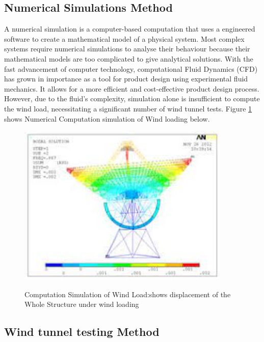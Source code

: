 {\subsection{Numerical Simulations  Method}
 
 A numerical simulation is a computer-based computation that uses a engineered software to create a mathematical model of a physical system. Most complex systems require numerical simulations to analyse their behaviour because their mathematical models are too complicated to give analytical solutions. With the fast advancement of computer technology,  computational Fluid Dynamics (CFD)  has grown in importance as a tool for product design using experimental fluid mechanics.\cite{kathrein_2016,en19911,omenzetter2000suppression,kim2000numerical,huawei_2017}
It allows for a more efficient and cost-effective product design process. However, due to the fluid's complexity, simulation alone is insufficient to compute the wind load, necessitating a significant number of wind tunnel tests.
 Figure \ref{fig:3.1} shows Numerical Computation simulation of Wind loading below.
 
 \begin{figure}[htp]
     \centering
 \includegraphics[width=4in]{Figures/Wind_load_ Displacement .jpg}
\caption{Computation Simulation of Wind Load:shows displacement of the Whole Structure under wind loading}
{\cite{liu2017reflector}}
     \label{fig:3.1}
 \end{figure}
 

 
\subsection{ Wind tunnel testing Method}

}
